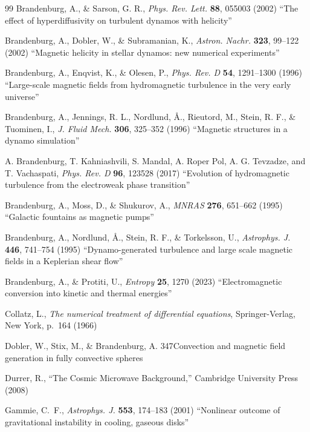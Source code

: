\documentclass[\mydriver,12pt,twoside,notitlepage,a4paper]{article}
\begin{document}
\begin{thebibliography}{99}
 Brandenburg, A., \& Sarson, G. R.,
  \emph{Phys. Rev. Lett.} \textbf{88}, 055003 (2002)
  ``The effect of hyperdiffusivity on turbulent dynamos with helicity''

Brandenburg, A., Dobler, W., \& Subramanian, K.,
  \emph{Astron. Nachr.} \textbf{323}, 99--122 (2002)
  ``Magnetic helicity in stellar dynamos: new numerical experiments''

Brandenburg, A., Enqvist, K., \& Olesen, P.,
  \emph{Phys. Rev. D} \textbf{54}, 1291--1300 (1996)
  ``Large-scale magnetic fields from hydromagnetic turbulence
in the very early universe''

 Brandenburg, A., Jennings, R. L., Nordlund, \AA.,
  Rieutord, M., Stein, R. F., \& Tuominen, I.,
  \emph{J. Fluid Mech.} \textbf{306}, 325--352 (1996)
  ``Magnetic structures in a dynamo simulation''

A. Brandenburg, T. Kahniashvili, S. Mandal, A. Roper Pol, A. G. Tevzadze, and T. Vachaspati, 
  \emph{Phys. Rev. D} \textbf{96}, 123528 (2017)
  ``Evolution of hydromagnetic turbulence from the electroweak phase transition''

Brandenburg, A., Moss, D., \& Shukurov, A.,
  \emph{MNRAS} \textbf{276}, 651--662 (1995)
  ``Galactic fountains as magnetic pumps''

 Brandenburg, A., Nordlund, \AA., Stein, R. F.,
  \& Torkelsson, U.,
  \emph{Astrophys. J.} \textbf{446}, 741--754 (1995)
  ``Dynamo-generated turbulence and large scale magnetic fields
  in a Keplerian shear flow''

 Brandenburg, A., \& Protiti, U.,
  \emph{Entropy} \textbf{25}, 1270 (2023)
  ``Electromagnetic conversion into kinetic and thermal energies''

Collatz, L.,
  \emph{The numerical treatment of differential equations},
  Springer-Verlag, New York, p.\ 164 (1966)

  Dobler, W., Stix, M., \& Brandenburg, A.
  {347}{Convection and magnetic field generation in fully convective spheres}

Durrer, R., ``The Cosmic Microwave Background,''
Cambridge University Press (2008)

Gammie, C.~F.,
  \emph{Astrophys. J.} \textbf{553}, 174--183 (2001)
  ``Nonlinear outcome of gravitational instability in cooling, gaseous disks''


\end{thebibliography}
\end{document}
